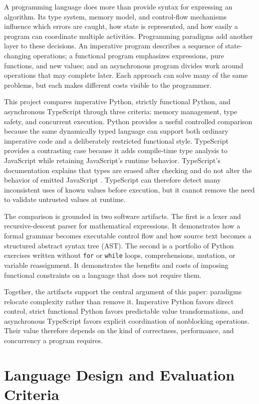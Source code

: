 \documentclass[12pt]{article}
\begin{document}
A programming language does more than provide syntax for expressing an algorithm. Its type system, memory model, and control-flow mechanisms influence which errors are caught, how state is represented, and how easily a program can coordinate multiple activities. Programming paradigms add another layer to these decisions. An imperative program describes a sequence of state-changing operations; a functional program emphasizes expressions, pure functions, and new values; and an asynchronous program divides work around operations that may complete later. Each approach can solve many of the same problems, but each makes different costs visible to the programmer.


This project compares imperative Python, strictly functional Python, and asynchronous TypeScript through three criteria: memory management, type safety, and concurrent execution. Python provides a useful controlled comparison because the same dynamically typed language can support both ordinary imperative code and a deliberately restricted functional style. TypeScript provides a contrasting case because it adds compile-time type analysis to JavaScript while retaining JavaScript's runtime behavior. TypeScript's documentation explains that types are erased after checking and do not alter the behavior of emitted JavaScript \cite{ref1}. TypeScript can therefore detect many inconsistent uses of known values before execution, but it cannot remove the need to validate untrusted values at runtime.


The comparison is grounded in two software artifacts. The first is a lexer and recursive-descent parser for mathematical expressions. It demonstrates how a formal grammar becomes executable control flow and how source text becomes a structured abstract syntax tree (AST). The second is a portfolio of Python exercises written without \texttt{for} or \texttt{while} loops, comprehensions, mutation, or variable reassignment. It demonstrates the benefits and costs of imposing functional constraints on a language that does not require them.


Together, the artifacts support the central argument of this paper: paradigms relocate complexity rather than remove it. Imperative Python favors direct control, strict functional Python favors predictable value transformations, and asynchronous TypeScript favors explicit coordination of nonblocking operations. Their value therefore depends on the kind of correctness, performance, and concurrency a program requires.


\section{Language Design and Evaluation Criteria}
\end{document}
